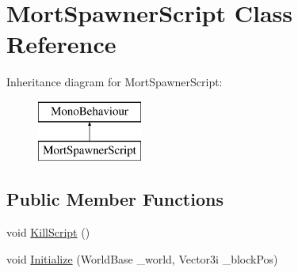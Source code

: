 \hypertarget{class_mort_spawner_script}{}\section{Mort\+Spawner\+Script Class Reference}
\label{class_mort_spawner_script}
Inheritance diagram for Mort\+Spawner\+Script\+:\begin{figure}[H]
\begin{center}
\leavevmode
\includegraphics[height=2.000000cm]{class_mort_spawner_script}
\end{center}
\end{figure}
\subsection*{Public Member Functions}
\begin{DoxyCompactItemize}
\item 
void \mbox{\hyperlink{class_mort_spawner_script_abbdcbd5b022cdc08814b203cef65dfa1}{Kill\+Script}} ()
\item 
void \mbox{\hyperlink{class_mort_spawner_script_a6b9fd10724d483ddf05dc342cad37891}{Initialize}} (World\+Base \+\_\+world, Vector3i \+\_\+block\+Pos)
\end{DoxyCompactItemize}
